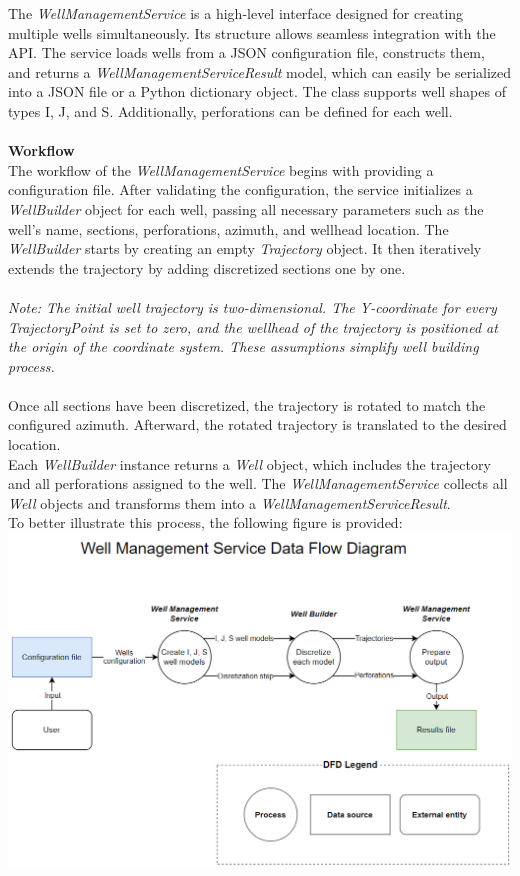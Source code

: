 \documentclass[english,10pt,a4paper]{article}
\begin{document}
The \textit{WellManagementService} is a high-level interface designed for creating multiple wells simultaneously. Its structure allows seamless integration with the API.
The service loads wells from a JSON configuration file, constructs them, and returns a \textit{WellManagementServiceResult} model, which can easily be serialized into a JSON file or a Python dictionary object. The class supports well shapes of types I, J, and S. Additionally, perforations can be defined for each well.\\\\
\textbf{Workflow}\\
The workflow of the \textit{WellManagementService} begins with providing a configuration file. After validating the configuration, the service initializes a \textit{WellBuilder} object for each well, passing all necessary parameters such as the well's name, sections, perforations, azimuth, and wellhead location.
The \textit{WellBuilder} starts by creating an empty \textit{Trajectory} object. It then iteratively extends the trajectory by adding discretized sections one by one.\\\\
\textit{Note: The initial well trajectory is two-dimensional. The Y-coordinate for every \textit{TrajectoryPoint} is set to zero, and the wellhead of the trajectory is positioned at the origin of the coordinate system. These assumptions simplify well building process.}\\\\
Once all sections have been discretized, the trajectory is rotated to match the configured azimuth. Afterward, the rotated trajectory is translated to the desired location.\\
Each \textit{WellBuilder} instance returns a \textit{Well} object, which includes the trajectory and all perforations assigned to the well. The \textit{WellManagementService} collects all \textit{Well} objects and transforms them into a \textit{WellManagementServiceResult}.\\
To better illustrate this process, the following figure is provided:\\

\includegraphics[width=1.0\textwidth]{images/well_management_service/WMS_Data-Flow-Diagram.png}
\end{document}
